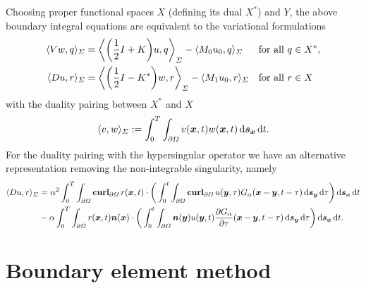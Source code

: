 \documentclass[a4paper,11pt]{article}
\begin{document}
Choosing proper functional spaces $X$ (defining its dual $X^\ast$) and $Y$, the above boundary integral equations are equivalent to the variational formulations
\begin{align}
  \label{eq:v_form}
  \langle Vw, q \rangle_\Sigma &= \bigg\langle \bigg( \frac{1}{2}I + K \bigg) u, q \bigg\rangle_\Sigma - \langle M_0 u_0, q \rangle_\Sigma &&\text{for all } q \in X^\ast,\\
  \notag
  \langle Du, r \rangle_\Sigma &= \bigg\langle \bigg( \frac{1}{2}I - K^\ast \bigg) w, r \bigg\rangle_\Sigma - \langle M_1 u_0, r \rangle_\Sigma &&\text{for all } r \in X
\end{align}
with the duality pairing between $X^\ast$ and $X$
\begin{equation*}
  \langle v, w \rangle_\Sigma := \int_0^T \int_{\partial\Omega} v({{\bm{x}}},t) w({{\bm{x}}},t) \,{\mathrm{d}}{{\bm{s}}}_{{\bm{x}}} \,{\mathrm{d}} t.
\end{equation*}
For the duality pairing with the hypersingular operator we have an alternative representation removing the non-integrable singularity, namely
\begin{equation}
\label{eq:D_bil}
\begin{aligned}
  \langle Du, r \rangle_\Sigma &= \alpha^2 \int_0^T \int_{\partial\Omega} \operatorname{\mathbf{curl}}_{\partial\Omega} r({{\bm{x}}},t) \cdot \bigg( \int_0^t \int_{\partial\Omega} \operatorname{\mathbf{curl}}_{\partial\Omega} u({{\bm{y}}},\tau) G_\alpha({{\bm{x}}}-{{\bm{y}}},t-\tau) \,{\mathrm{d}}{{\bm{s}}}_{{\bm{y}}} \,{\mathrm{d}}\tau \bigg) \,{\mathrm{d}}{{\bm{s}}}_{{\bm{x}}} \,{\mathrm{d}} t \\
  &- \alpha \int_0^T \int_{\partial\Omega} r({{\bm{x}}},t) {{\bm{n}}}({{\bm{x}}}) \cdot \bigg( \int_0^t \int_{\partial\Omega} {{\bm{n}}}({{\bm{y}}}) u({{\bm{y}}},t) \frac{\partial G_\alpha}{\partial \tau}({{\bm{x}}}-{{\bm{y}}},t-\tau) \,{\mathrm{d}}{{\bm{s}}}_{{\bm{y}}} \,{\mathrm{d}}\tau \bigg) \,{\mathrm{d}}{{\bm{s}}}_{{\bm{x}}} \,{\mathrm{d}} t.
\end{aligned}
\end{equation}

\section{Boundary element method}
\end{document}
